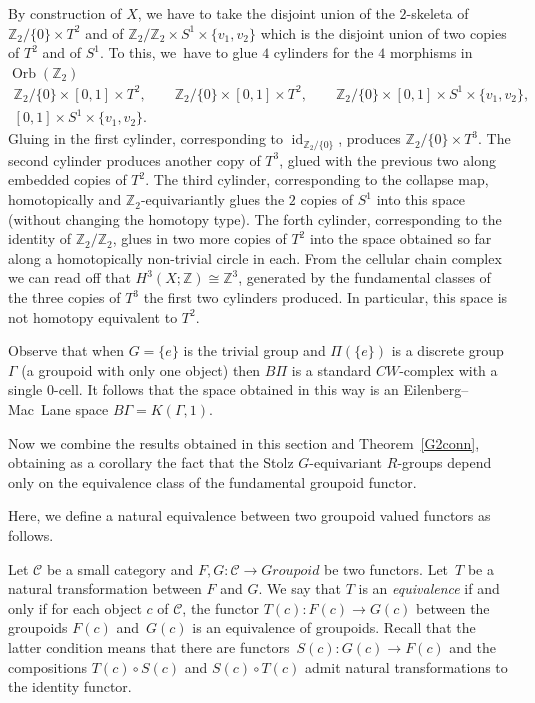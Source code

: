 \documentclass[pdftex]{sigma}
\numberwithin{equation}{section}
\def\ZZ{\ensuremath{\mathbb{Z}}}
\DeclareMathOperator{\id}{id}
\DeclareMathOperator{\Orb}{Orb}
\begin{document}
\begin{Example}
		By construction of $X$, we have to take the disjoint union of the $2$-skeleta of
		$\ZZ_2/\{0\}\times T^2$ and of $\ZZ_2/\ZZ_2\times S^1\times \{v_1,v_2\}$ which
		is the disjoint union of two copies of $T^2$ and of $S^1$. To this, we~have to
		glue $4$ cylinders for the $4$ morphisms in $\Orb(\ZZ_2)$
		\begin{gather*}
				 \ZZ_2/\{0\}\times [0,1]\times T^2,\qquad\ZZ_2/\{0\}\times [0,1]\times T^2,
				\qquad \ZZ_2/\{0\}\times [0,1]\times S^1\times \{v_1,v_2\}, \\ [0,1]\times S^1\times
				\{v_1,v_2\}.
		\end{gather*}
		Gluing in the first cylinder, corresponding to $\id_{\ZZ_2/\{0\}}$, produces
		$\ZZ_2/\{0\}\times T^3$. The second cylinder produces another copy of $T^3$,
		glued with the previous two along embedded copies of $T^2$. The third
		cylinder, corresponding to the
		collapse map, homotopically and $\ZZ_2$-equivariantly glues the $2$ copies of
		$S^1$ into this space (without changing the homotopy type). The forth cylinder, corresponding to the identity of $\ZZ_2/\ZZ_2$,
		glues in two more copies of $T^2$ into the space obtained so far along a
		homotopically non-trivial circle in each. From the cellular chain complex we
		can read off that $H^3(X;\ZZ)\cong \ZZ^3$, generated by the
		fundamental classes of the three copies of $T^3$ the first two cylinders
		produced. In particular, this space is not homotopy equivalent to $T^2$.
\end{Example}

	
	\begin{Remark}\label{rem:BG}
		Observe that when $G=\{e\}$ is the trivial group and $\Pi(\{e\})$ is a
		discrete group $\Gamma$
		(a groupoid with only one object) then $B\Pi$ is a standard
		$CW$-complex with a single $0$-cell. It follows that the space obtained in
		this way is an Eilenberg--Mac~Lane space $B\Gamma=K(\Gamma,1)$.
	\end{Remark}
	
	Now we combine the results obtained in this section and Theorem~\ref{G2conn},
	obtaining as a corollary the fact that the Stolz $G$-equivariant $R$-groups
	depend only on the equivalence class of the fundamental groupoid functor.
	
	Here, we define a natural equivalence between two groupoid valued functors as
	follows.
	\begin{Definition}\label{def:eq_of_fct}
		Let $ \mathcal{C}$ be a small category and $F,G\colon \mathcal{C}\to Groupoid$ be two
		functors. Let~$T$ be a natural transformation between $F$ and $G$. We say
		that $T$ is an \emph{equivalence} if and only if for each object $c$ of $ \mathcal{C}$,
		the functor $T(c)\colon F(c)\to G(c)$ between the groupoids $F(c)$ and~$G(c)$ is an equivalence of groupoids. Recall that the latter condition means that there
		are functors~${S(c)\colon G(c)\to F(c)}$ and the compositions $T(c)\circ S(c)$
		and $S(c)\circ T(c)$ admit natural transformations to the identity functor.
	\end{Definition}
	
\end{document}
